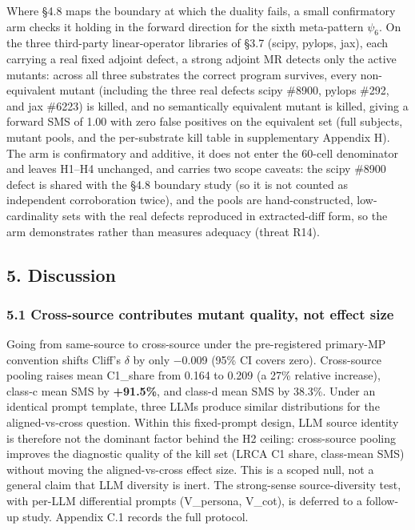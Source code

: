 \documentclass[review,12pt,authoryear]{elsarticle}
\begin{document}
Where §4.8 maps the boundary at which the duality fails, a small
confirmatory arm checks it holding in the forward direction for the sixth
meta-pattern $\psi_6$. On the three third-party linear-operator libraries
of §3.7 (scipy, pylops, jax), each carrying a real fixed adjoint defect, a
strong adjoint MR detects only the active mutants: across all three
substrates the correct program survives, every non-equivalent mutant
(including the three real defects scipy \#8900, pylops \#292, and jax
\#6223) is killed, and no semantically equivalent mutant is killed, giving
a forward SMS of 1.00 with zero false positives on the equivalent set
(full subjects, mutant pools, and the per-substrate kill table in
supplementary Appendix H). The arm is confirmatory and additive, it
does not enter the 60-cell denominator and leaves H1--H4 unchanged, and
carries two scope caveats: the scipy \#8900 defect is shared with the §4.8
boundary study (so it is not counted as independent corroboration twice),
and the pools are hand-constructed, low-cardinality sets with the real
defects reproduced in extracted-diff form, so the arm demonstrates rather
than measures adequacy (threat R14).


\subsection{5. Discussion}\label{discussion}

\subsubsection{5.1 Cross-source contributes mutant quality, not effect size}\label{cross-source-contributes-mutant-quality-not-effect-size}

Going from same-source to cross-source under the pre-registered
primary-MP convention shifts Cliff's $\delta$ by only −0.009 (95\% CI covers
zero). Cross-source pooling raises mean C1\_share from 0.164 to 0.209 (a
27\% relative increase), class-c mean SMS by \textbf{+91.5\%}, and
class-d mean SMS by 38.3\%. Under an identical prompt template, three
LLMs produce similar distributions for the aligned-vs-cross question.
Within this fixed-prompt design, LLM source identity is therefore not the
dominant factor behind the H2 ceiling: cross-source pooling improves the
diagnostic quality of the kill set (LRCA C1 share, class-mean SMS)
without moving the aligned-vs-cross effect size. This is a scoped null,
not a general claim that LLM diversity is inert. The strong-sense
source-diversity test, with per-LLM differential prompts (V\_persona,
V\_cot), is deferred to a follow-up study. Appendix C.1 records the full
protocol.
\end{document}
